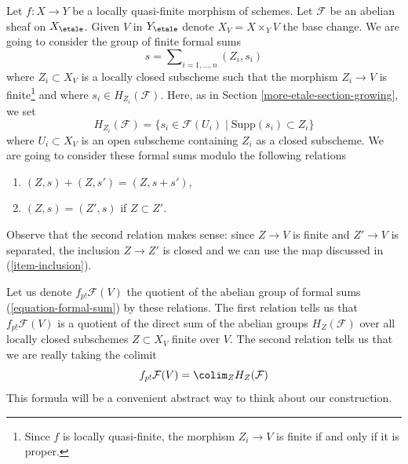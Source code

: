 \medskip\noindent
Let $f : X \to Y$ be a locally quasi-finite morphism of schemes.
Let $\mathcal{F}$ be an abelian sheaf on $X_\etale$. Given $V$ in
$Y_\etale$ denote $X_V = X \times_Y V$ the base change. We are going
to consider the group of finite formal sums
\begin{equation}
\label{equation-formal-sum}
s = \sum\nolimits_{i = 1, \ldots, n} (Z_i, s_i)
\end{equation}
where $Z_i \subset X_V$ is a locally closed subscheme such that the
morphism $Z_i \to V$ is finite\footnote{Since $f$ is locally quasi-finite,
the morphism $Z_i \to V$ is finite if and only if it is proper.}
and where $s_i \in H_{Z_i}(\mathcal{F})$. Here, as in
Section \ref{more-etale-section-growing}, we set
$$
H_{Z_i}(\mathcal{F}) =
\{s_i \in \mathcal{F}(U_i) \mid \text{Supp}(s_i) \subset Z_i\}
$$
where $U_i \subset X_V$ is an open subscheme containing $Z_i$ as a
closed subscheme. We are going to consider these formal sums modulo the
following relations
\begin{enumerate}
\item
\label{more-etale-item-sum}
$(Z, s) + (Z, s') = (Z, s + s')$,
\item
\label{more-etale-item-sub}
$(Z, s) = (Z', s)$ if $Z \subset Z'$.
\end{enumerate}
Observe that the second relation makes sense: since $Z \to V$ is finite
and $Z' \to V$ is separated, the inclusion $Z \to Z'$ is closed and we
can use the map discussed in (\ref{item-inclusion}).

\medskip\noindent
Let us denote $f_{p!}\mathcal{F}(V)$ the quotient of the abelian
group of formal sums (\ref{equation-formal-sum}) by these relations.
The first relation tells us that $f_{p!}\mathcal{F}(V)$ is a quotient
of the direct sum of the abelian groups $H_Z(\mathcal{F})$
over all locally closed subschemes $Z \subset X_V$ finite over $V$.
The second relation tells us that we are really taking the colimit
\begin{equation}
\label{equation-colimit-definition}
f_{p!}\mathcal{F}(V) = \colim_Z H_Z(\mathcal{F})
\end{equation}
This formula will be a convenient abstract way to think about
our construction.


